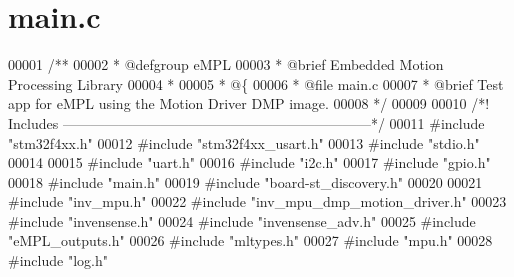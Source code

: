 \section{main.\+c}
\label{main_8c_source}

\begin{DoxyCode}
00001 \textcolor{comment}{/**}
00002 \textcolor{comment}{ *   @defgroup  eMPL}
00003 \textcolor{comment}{ *   @brief     Embedded Motion Processing Library}
00004 \textcolor{comment}{ *}
00005 \textcolor{comment}{ *   @\{}
00006 \textcolor{comment}{ *       @file      main.c}
00007 \textcolor{comment}{ *       @brief     Test app for eMPL using the Motion Driver DMP image.}
00008 \textcolor{comment}{ */}
00009 
00010 \textcolor{comment}{/*! Includes ------------------------------------------------------------------*/}
00011 \textcolor{preprocessor}{#}\textcolor{preprocessor}{include} "stm32f4xx.h"
00012 \textcolor{preprocessor}{#}\textcolor{preprocessor}{include} "stm32f4xx_usart.h"
00013 \textcolor{preprocessor}{#}\textcolor{preprocessor}{include} \textcolor{preprocessor}{"stdio.h"}
00014 
00015 \textcolor{preprocessor}{#}\textcolor{preprocessor}{include} "uart.h"
00016 \textcolor{preprocessor}{#}\textcolor{preprocessor}{include} "i2c.h"
00017 \textcolor{preprocessor}{#}\textcolor{preprocessor}{include} "gpio.h"
00018 \textcolor{preprocessor}{#}\textcolor{preprocessor}{include} "main.h"
00019 \textcolor{preprocessor}{#}\textcolor{preprocessor}{include} "board-st_discovery.h"
00020 
00021 \textcolor{preprocessor}{#}\textcolor{preprocessor}{include} \textcolor{preprocessor}{"inv\_mpu.h"}
00022 \textcolor{preprocessor}{#}\textcolor{preprocessor}{include} \textcolor{preprocessor}{"inv\_mpu\_dmp\_motion\_driver.h"}
00023 \textcolor{preprocessor}{#}\textcolor{preprocessor}{include} \textcolor{preprocessor}{"invensense.h"}
00024 \textcolor{preprocessor}{#}\textcolor{preprocessor}{include} \textcolor{preprocessor}{"invensense\_adv.h"}
00025 \textcolor{preprocessor}{#}\textcolor{preprocessor}{include} \textcolor{preprocessor}{"eMPL\_outputs.h"}
00026 \textcolor{preprocessor}{#}\textcolor{preprocessor}{include} \textcolor{preprocessor}{"mltypes.h"}
00027 \textcolor{preprocessor}{#}\textcolor{preprocessor}{include} \textcolor{preprocessor}{"mpu.h"}
00028 \textcolor{preprocessor}{#}\textcolor{preprocessor}{include} \textcolor{preprocessor}{"log.h"}

\end{DoxyCode}
